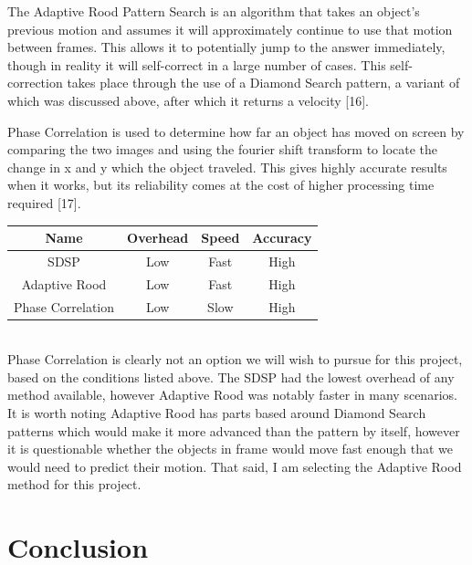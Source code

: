 \documentclass[onecolumn, draftclsnofoot,10pt, compsoc]{IEEEtran}
\begin{document}
The Adaptive Rood Pattern Search is an algorithm that takes an object's previous motion and assumes it will approximately continue to use that motion between frames.  This allows it to potentially jump to the answer immediately, though in reality it will self-correct in a large number of cases.  This self-correction takes place through the use of a Diamond Search pattern, a variant of which was discussed above, after which it returns a velocity [16].

Phase Correlation is used to determine how far an object has moved on screen by comparing the two images and using the fourier shift transform to locate the change in x and y which the object traveled.  This gives highly accurate results when it works, but its reliability comes at the cost of higher processing time required [17].

\begin{tabular}{|c|c|c|c|}
  \hline
  \textbf{Name} & \textbf{Overhead} & \textbf{Speed} & \textbf{Accuracy} \\
  \hline
  SDSP & Low & Fast & High \\ 
  \hline
  Adaptive Rood & Low & Fast & High  \\ 
  \hline
  Phase Correlation & Low & Slow & High \\ 
  \hline
\end{tabular} \\

Phase Correlation is clearly not an option we will wish to pursue for this project, based on the conditions listed above.  The SDSP had the lowest overhead of any method available, however Adaptive Rood was notably faster in many scenarios.  It is worth noting Adaptive Rood has parts based around Diamond Search patterns which would make it more advanced than the pattern by itself, however it is questionable whether the objects in frame would move fast enough that we would need to predict their motion.  That said, I am selecting the Adaptive Rood method for this project.

\newpage
\section{Conclusion}
\end{document}
